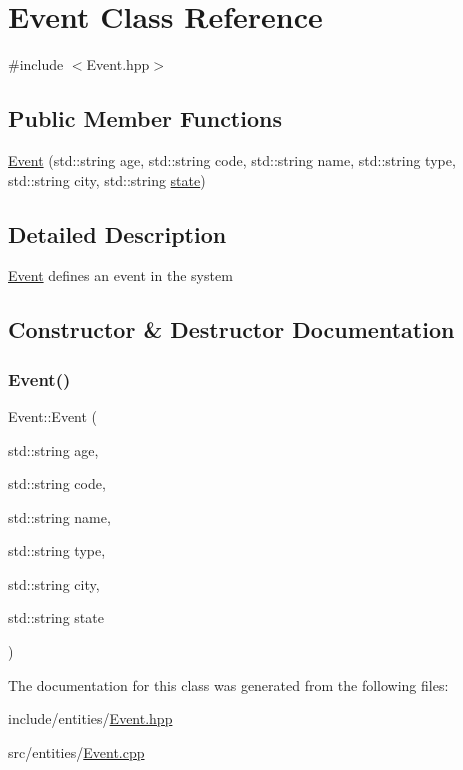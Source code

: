 \hypertarget{class_event}{}\section{Event Class Reference}
\label{class_event}


{\ttfamily \#include $<$Event.\+hpp$>$}

\subsection*{Public Member Functions}
\begin{DoxyCompactItemize}
\item 
\mbox{\hyperlink{class_event_a08075ed6b8cd5785ea41566df517ef27}{Event}} (std\+::string age, std\+::string code, std\+::string name, std\+::string type, std\+::string city, std\+::string \mbox{\hyperlink{states_8hpp_adc6e5733fc3c22f0a7b2914188c49c90}{state}})
\end{DoxyCompactItemize}


\subsection{Detailed Description}
\mbox{\hyperlink{class_event}{Event}} defines an event in the system 

\subsection{Constructor \& Destructor Documentation}
\mbox{\label{class_event_a08075ed6b8cd5785ea41566df517ef27}} 
\subsubsection{\texorpdfstring{Event()}{Event()}}
{\footnotesize\ttfamily Event\+::\+Event (\begin{DoxyParamCaption}\item[{std\+::string}]{age,  }\item[{std\+::string}]{code,  }\item[{std\+::string}]{name,  }\item[{std\+::string}]{type,  }\item[{std\+::string}]{city,  }\item[{std\+::string}]{state }\end{DoxyParamCaption})}



The documentation for this class was generated from the following files\+:\begin{DoxyCompactItemize}
\item 
include/entities/\mbox{\hyperlink{_event_8hpp}{Event.\+hpp}}\item 
src/entities/\mbox{\hyperlink{_event_8cpp}{Event.\+cpp}}\end{DoxyCompactItemize}
